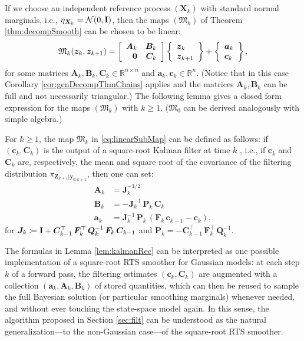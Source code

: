 \documentclass[twoside,11pt]{article}
\newcommand{\Gauss}{\mathcal{N}}                                      %
\newcommand{\re}{\mathbb{R}}
\newcommand{\Xb}{\boldsymbol{X}}
\newcommand{\yb}{\boldsymbol{y}}
\newcommand{\Pb}{\boldsymbol{P}}
\newcommand{\Zb}{\boldsymbol{Z}}
\newcommand{\zb}{\boldsymbol{z}}
\newcommand{\Fb}{\boldsymbol{F}}
\newcommand{\Qb}{\boldsymbol{Q}}
\newcommand{\Ab}{\boldsymbol{A}}
\newcommand{\ab}{\boldsymbol{a}}
\newcommand{\Bb}{\boldsymbol{B}}
\newcommand{\Cb}{\boldsymbol{C}}
\newcommand{\cb}{\boldsymbol{c}}
\newcommand{\Jb}{\boldsymbol{J}}
\newcommand{\submap}{\mathfrak{M}}
\newcommand{\forop}{ \Fb }
\newcommand{\noisedcov}{ \Qb }
\begin{document}
If we choose an independent reference process $(\Xb_k)$ with standard normal
marginals, i.e., $\eta_{\Xb_k} = \Gauss(0, {\bf I})$, 
%
 then the
maps $(\submap_k)$ of Theorem \ref{thm:decompSmooth} can be chosen
to be linear:
\begin{equation}   \label{eq:linearSubMap}
  \submap_k( \zb_k , \zb_{k+1} ) = 
  \left[
    \begin{array}{rr}
    \Ab_k & \Bb_k \\ 
    {\bf 0} & \Cb_k
    \end{array}
  \right]
  \left \{ 
    \begin{array}{l}
    \zb_k \\ 
    \zb_{k+1} 
    \end{array}
  \right \} + 
  \left \{ 
    \begin{array}{l}
    \ab_k \\ 
    \cb_k 
    \end{array}
  \right \},  
\end{equation}
for some matrices $\Ab_k,\Bb_k,\Cb_k \in \re^{n \times n}$ and $\ab_k,\cb_k\in \re^n$.
(Notice that in this case Corollary \ref{cor:genDecompThmChains} applies and
the matrices $\Ab_k,\Bb_k$ can be full and not necessarily triangular.)
The following lemma gives a closed form expression for the maps
$(\submap_k)$ with $k\ge 1$. ($\submap_0$ can be
derived analogously with simple algebra.) 
%
\begin{lemma} \label{lem:kalmanRec}
For $k\ge 1$, the map $\submap_k$ in \eqref{eq:linearSubMap} can be defined
as follows: if $(\cb_k , \Cb_k)$ is the output of a 
square-root Kalman filter at time $k$ \citep{bierman2006factorization},
i.e., if $\cb_k$ and $\Cb_k$ are, respectively, the mean and square root of the covariance of the
filtering distribution
$\pi_{\Zb_{k+1}\vert\yb_{0:k+1}}$, 
%
%
%
%
%
%
%
%
 then one can set:
\begin{align} \label{eq:recursionKalm}
  \Ab_k &= \Jb_{k}^{-1/2} \\
  \Bb_k &=  
  - \Jb_{k}^{-1} \, \Pb_{k} \, \Cb_k \nonumber \\
  \ab_k &= 
  \Jb_{k}^{-1} \, \Pb_{k} \, (\forop_k\,\cb_{k-1}- \cb_k) \nonumber,
\end{align}
%
for $\Jb_{k} \coloneqq {\bf I} + \Cb_{k-1}^\top \, \forop_{k}^\top \, \noisedcov_k^{-1} \, 
    \forop_{k} \, \Cb_{k-1}$ and
$\Pb_{k} = - \Cb_{k-1}^\top\,\Fb_k^\top\,\Qb_k^{-1}$.   
\end{lemma}
%
%
The formulas in Lemma \ref{lem:kalmanRec} can be interpreted as
one possible implementation of a square-root
RTS smoother for Gaussian models: at each step $k$ 
of a forward pass, the filtering estimates $(\cb_k , \Cb_k)$
are augmented with a collection $(\ab_k,\Ab_k,\Bb_k)$ of stored quantities, which
can then be reused to sample  the full Bayesian
solution (or particular smoothing marginals) whenever needed, and
without ever touching the state-space model again. 
%
%
In this sense, the algorithm proposed in Section \ref{sec:filt} can be
understood 
as the natural
generalization---to the non-Gaussian case---of 
the square-root %
RTS smoother. 
\end{document}
